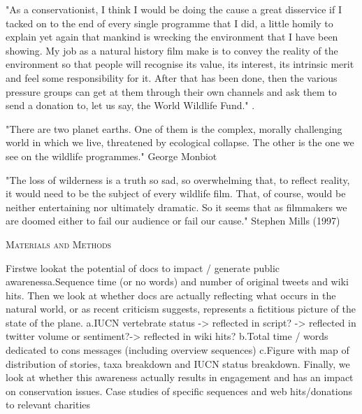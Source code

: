 \documentclass[12pt,letterpaper]{article}
\renewcommand{\section}[1]{%
\bigskip
\begin{center}
\begin{Large}
\normalfont\scshape #1
\medskip
\end{Large}
\end{center}}
\begin{document}
"As a conservationist, I think I would be doing the cause a great disservice if I tacked on to the end of every single programme that I did, a little homily to explain yet again that mankind is wrecking the environment that I have been showing. My job as a natural history film make is to convey the reality of the environment so that people will recognise its value, its interest, its intrinsic merit and feel some responsibility for it. After that has been done, then the various pressure groups can get at them through their own channels and ask them to send a donation to, let us say, the World Wildlife Fund." \cite{burgess1984exploring}.

"There are two planet earths. One of them is the complex, morally challenging world in which we live, threatened by ecological collapse. The other is the one we see on the wildlife programmes." George Monbiot

"The loss of wilderness is a truth so sad, so overwhelming that, to reflect reality, it would need to be the subject of every wildlife film. That, of course, would be neither entertaining nor ultimately dramatic. So it seems that as filmmakers we are doomed either to fail our audience or fail our cause."
Stephen Mills (1997)

%
%
\section{Materials and Methods}
Firstwe lookat the potential of docs to impact / generate public awarenessa.Sequence time (or no words) and number of original tweets and wiki hits. Then we look at whether docs are actually reflecting what occurs in the natural world, or as recent criticism suggests, represents a fictitious picture of the state of the plane. a.IUCN vertebrate status -> reflected in script? -> reflected in twitter volume or sentiment?-> reflected in wiki hits? b.Total time / words dedicated to cons messages (including overview sequences) c.Figure with map of distribution of stories, taxa breakdown and IUCN status breakdown. Finally, we look at whether this awareness actually results in engagement and has an impact on conservation issues. Case studies of specific sequences and web hits/donations to relevant charities

%
%
\end{document}
